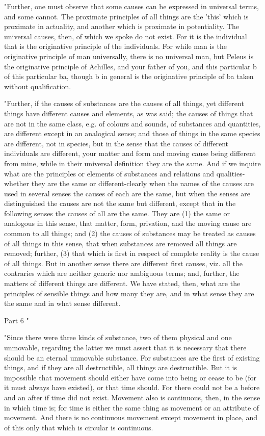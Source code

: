 "Further, one must observe that some causes can be expressed in universal
terms, and some cannot. The proximate principles of all things are
the 'this' which is proximate in actuality, and another which is proximate
in potentiality. The universal causes, then, of which we spoke do
not exist. For it is the individual that is the originative principle
of the individuals. For while man is the originative principle of
man universally, there is no universal man, but Peleus is the originative
principle of Achilles, and your father of you, and this particular
b of this particular ba, though b in general is the originative principle
of ba taken without qualification. 

"Further, if the causes of substances are the causes of all things,
yet different things have different causes and elements, as was said;
the causes of things that are not in the same class, e.g. of colours
and sounds, of substances and quantities, are different except in
an analogical sense; and those of things in the same species are different,
not in species, but in the sense that the causes of different individuals
are different, your matter and form and moving cause being different
from mine, while in their universal definition they are the same.
And if we inquire what are the principles or elements of substances
and relations and qualities-whether they are the same or different-clearly
when the names of the causes are used in several senses the causes
of each are the same, but when the senses are distinguished the causes
are not the same but different, except that in the following senses
the causes of all are the same. They are (1) the same or analogous
in this sense, that matter, form, privation, and the moving cause
are common to all things; and (2) the causes of substances may be
treated as causes of all things in this sense, that when substances
are removed all things are removed; further, (3) that which is first
in respect of complete reality is the cause of all things. But in
another sense there are different first causes, viz. all the contraries
which are neither generic nor ambiguous terms; and, further, the matters
of different things are different. We have stated, then, what are
the principles of sensible things and how many they are, and in what
sense they are the same and in what sense different. 

Part 6 "

"Since there were three kinds of substance, two of them physical and
one unmovable, regarding the latter we must assert that it is necessary
that there should be an eternal unmovable substance. For substances
are the first of existing things, and if they are all destructible,
all things are destructible. But it is impossible that movement should
either have come into being or cease to be (for it must always have
existed), or that time should. For there could not be a before and
an after if time did not exist. Movement also is continuous, then,
in the sense in which time is; for time is either the same thing as
movement or an attribute of movement. And there is no continuous movement
except movement in place, and of this only that which is circular
is continuous. 

